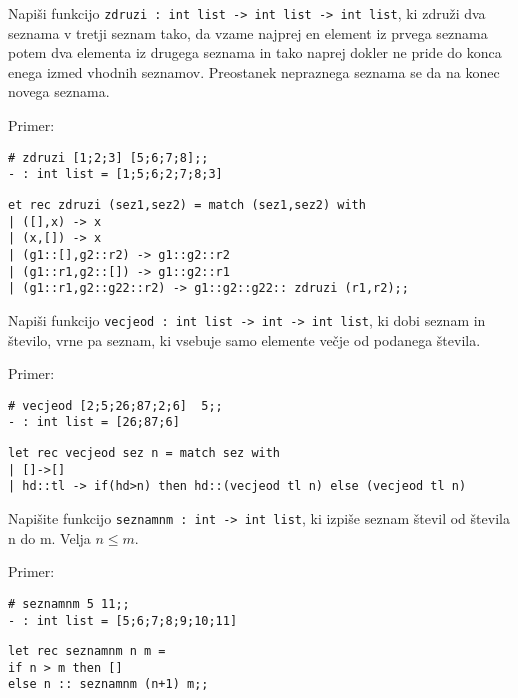 \begin{ex}
Napi\v si funkcijo \lstinline{zdruzi : int list -> int list -> int list}, ki zdru\v zi dva seznama v tretji seznam tako, da vzame najprej en element iz prvega seznama potem dva elementa iz drugega seznama in tako naprej dokler ne pride do konca enega izmed vhodnih seznamov. Preostanek nepraznega seznama se da na konec novega seznama.

Primer: \begin{lstlisting}
# zdruzi [1;2;3] [5;6;7;8];;
- : int list = [1;5;6;2;7;8;3]
\end{lstlisting}

\begin{sol}
\begin{lstlisting}
et rec zdruzi (sez1,sez2) = match (sez1,sez2) with
| ([],x) -> x 
| (x,[]) -> x 
| (g1::[],g2::r2) -> g1::g2::r2 
| (g1::r1,g2::[]) -> g1::g2::r1 
| (g1::r1,g2::g22::r2) -> g1::g2::g22:: zdruzi (r1,r2);;
\end{lstlisting}
\end{sol}



\end{ex}
\begin{ex}
Napi\v si funkcijo \lstinline{vecjeod : int list -> int -> int list}, ki dobi seznam in \v stevilo, vrne pa seznam, ki vsebuje samo elemente ve\v cje od podanega \v stevila.

Primer: \begin{lstlisting}
# vecjeod [2;5;26;87;2;6]  5;;
- : int list = [26;87;6] 
\end{lstlisting}

\begin{sol}
\begin{lstlisting}
let rec vecjeod sez n = match sez with
| []->[]
| hd::tl -> if(hd>n) then hd::(vecjeod tl n) else (vecjeod tl n)
\end{lstlisting}
\end{sol}

\end{ex}
\begin{ex}
Napi\v site funkcijo \lstinline{seznamnm : int -> int list}, ki izpi\v se seznam \v stevil od \v stevila n do m. Velja $n\le m$.

Primer: \begin{lstlisting}
# seznamnm 5 11;;
- : int list = [5;6;7;8;9;10;11] 
\end{lstlisting}

\begin{sol}
\begin{lstlisting}
let rec seznamnm n m =
if n > m then []
else n :: seznamnm (n+1) m;;
\end{lstlisting}
\end{sol}

\end{ex}
